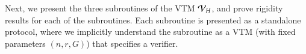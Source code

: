 \medskip
Next, we present the three subroutines of the VTM $\mathcal V_H$, and prove rigidity results for each of the subroutines. Each subroutine is presented as a standalone protocol, where we implicitly understand the subroutine as a VTM (with fixed parameters $(n,r,G)$) that specifies a verifier. 
%
%
%
%
%
%
%
%
%




